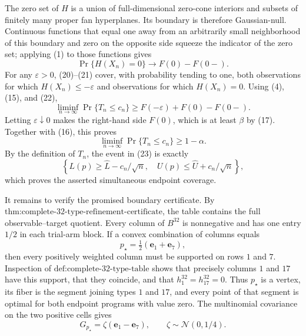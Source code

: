 The zero set of \(H\) is a union of full-dimensional zero-cone interiors and subsets of finitely many proper fan hyperplanes.  Its boundary is therefore Gaussian-null.  Continuous functions that equal one away from an arbitrarily small neighborhood of this boundary and zero on the opposite side squeeze the indicator of the zero set; applying (1) to those functions gives
\[
\Pr\{H(X_n)=0\}\longrightarrow F(0)-F(0-).
\tag{22}
\]
For any \(\varepsilon>0\), (20)--(21) cover, with probability tending to one, both observations for which \(H(X_n)\leq-\varepsilon\) and observations for which \(H(X_n)=0\).  Using (4), (15), and (22),
\[
\liminf_{n\to\infty}\Pr\{T_n\leq c_n\}
\geq F(-\varepsilon)+F(0)-F(0-).
\]
Letting \(\varepsilon\downarrow0\) makes the right-hand side \(F(0)\), which is at least \(\beta\) by (17).  Together with (16), this proves
\[
\liminf_{n\to\infty}\Pr\{T_n\leq c_n\}\geq1-\alpha.
\tag{23}
\]
By the definition of \(T_n\), the event in (23) is exactly
\[
\left\{L(p)\geq\widehat L-c_n/\sqrt n,\quad
U(p)\leq\widehat U+c_n/\sqrt n\right\},
\]
which proves the asserted simultaneous endpoint coverage.

It remains to verify the promised boundary certificate.  By \(\text{thm:complete-32-type-refinement-certificate}\), the table contains the full observable--target quotient.  Every column of \(B^{32}\) is nonnegative and has one entry \(1/2\) in each trial-arm block.  If a convex combination of columns equals
\[
p_\star=\tfrac12(\mathbf e_1+\mathbf e_7),
\]
then every positively weighted column must be supported on rows \(1\) and \(7\).  Inspection of \(\text{def:complete-32-type-table}\) shows that precisely columns \(1\) and \(17\) have this support, that they coincide, and that \(h^{32}_1=h^{32}_{17}=0\).  Thus \(p_\star\) is a vertex, its fiber is the segment joining types \(1\) and \(17\), and every point of that segment is optimal for both endpoint programs with value zero.  The multinomial covariance on the two positive cells gives
\[
G_{p_\star}=\zeta(\mathbf e_1-\mathbf e_7),
\qquad \zeta\sim\mathcal N(0,1/4).
\tag{24}
\]

